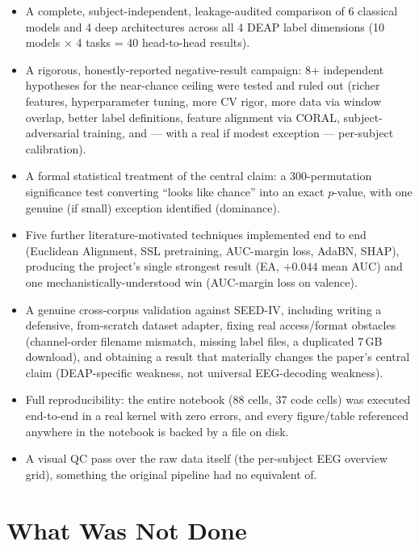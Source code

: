 \documentclass[11pt]{report}
\begin{document}
\begin{itemize}
  \item A complete, subject-independent, leakage-audited comparison of 6
        classical models and 4 deep architectures across all 4 DEAP label
        dimensions (10 models $\times$ 4 tasks = 40 head-to-head results).
  \item A rigorous, honestly-reported negative-result campaign: 8+
        independent hypotheses for the near-chance ceiling were tested and
        ruled out (richer features, hyperparameter tuning, more CV rigor,
        more data via window overlap, better label definitions, feature
        alignment via CORAL, subject-adversarial training, and --- with a
        real if modest exception --- per-subject calibration).
  \item A formal statistical treatment of the central claim: a 300-permutation
        significance test converting ``looks like chance'' into an exact
        $p$-value, with one genuine (if small) exception identified
        (dominance).
  \item Five further literature-motivated techniques implemented end to end
        (Euclidean Alignment, SSL pretraining, AUC-margin loss, AdaBN, SHAP),
        producing the project's single strongest result (EA, $+0.044$ mean
        AUC) and one mechanistically-understood win (AUC-margin loss on
        valence).
  \item A genuine cross-corpus validation against SEED-IV, including writing
        a defensive, from-scratch dataset adapter, fixing real access/format
        obstacles (channel-order filename mismatch, missing label files, a
        duplicated 7\,GB download), and obtaining a result that materially
        changes the paper's central claim (DEAP-specific weakness, not
        universal EEG-decoding weakness).
  \item Full reproducibility: the entire notebook (88 cells, 37 code cells)
        was executed end-to-end in a real kernel with zero errors, and every
        figure/table referenced anywhere in the notebook is backed by a file
        on disk.
  \item A visual QC pass over the raw data itself (the per-subject EEG
        overview grid), something the original pipeline had no equivalent
        of.
\end{itemize}

\chapter{What Was Not Done}
\label{ch:not-done}
\end{document}
